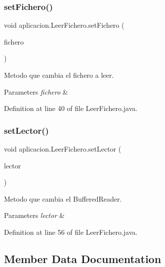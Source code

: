 \hypertarget{classaplicacion_1_1_leer_fichero_a8472b4b43bd6e2d3bc65a45e1f935b18}{}\label{classaplicacion_1_1_leer_fichero_a8472b4b43bd6e2d3bc65a45e1f935b18} 
\subsubsection{\texorpdfstring{set\+Fichero()}{setFichero()}}
{\footnotesize\ttfamily void aplicacion.\+Leer\+Fichero.\+set\+Fichero (\begin{DoxyParamCaption}\item[{File\+Reader}]{fichero }\end{DoxyParamCaption})}

Metodo que cambia el fichero a leer. 
\begin{DoxyParams}{Parameters}
{\em fichero} & \\
\hline
\end{DoxyParams}


Definition at line 40 of file Leer\+Fichero.\+java.

\hypertarget{classaplicacion_1_1_leer_fichero_aa4bde84f5a2616e197367dcb1d14bc77}{}\label{classaplicacion_1_1_leer_fichero_aa4bde84f5a2616e197367dcb1d14bc77} 
\subsubsection{\texorpdfstring{set\+Lector()}{setLector()}}
{\footnotesize\ttfamily void aplicacion.\+Leer\+Fichero.\+set\+Lector (\begin{DoxyParamCaption}\item[{Buffered\+Reader}]{lector }\end{DoxyParamCaption})}

Metodo que cambia el Buffered\+Reader. 
\begin{DoxyParams}{Parameters}
{\em lector} & \\
\hline
\end{DoxyParams}


Definition at line 56 of file Leer\+Fichero.\+java.



\subsection{Member Data Documentation}
\hypertarget{classaplicacion_1_1_leer_fichero_a9f9faaf160d4f3fdb36dfaf1c929fb13}{}\label{classaplicacion_1_1_leer_fichero_a9f9faaf160d4f3fdb36dfaf1c929fb13} 
